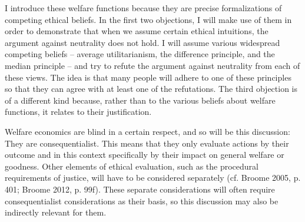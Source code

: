 I introduce these welfare functions because they are precise formalizations of competing ethical beliefs. In the first two objections, I will make use of them in order to demonstrate that when we assume certain ethical intuitions, the argument against neutrality does not hold. I will assume various widespread competing beliefs – average utilitarianism, the difference principle, and the median principle – and try to refute the argument against neutrality from each of these views. The idea is that many people will adhere to one of these principles so that they can agree with at least one of the refutations. The third objection is of a different kind because, rather than to the various beliefs about welfare functions, it relates to their justification.  

Welfare economics are blind in a certain respect, and so will be this discussion: They are consequentialist. This means that they only evaluate actions by their outcome and in this context specifically by their impact on general welfare or goodness. Other elements of ethical evaluation, such as the procedural requirements of justice, will have to be considered separately (cf. \label{ref:RNDcQ2WyYJ8nc}Broome 2005, p. 401; \label{ref:RNDc3AhfEFA9H}Broome 2012, p. 99f). These separate considerations will often require consequentialist considerations as their basis, so this discussion may also be indirectly relevant for them.  